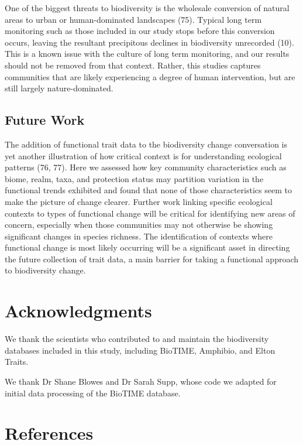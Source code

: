 \documentclass{article}
\begin{document}
One of the biggest threats to biodiversity is the wholesale conversion
of natural areas to urban or human-dominated landscapes (75). Typical
long term monitoring such as those included in our study stops before
this conversion occurs, leaving the resultant precipitous declines in
biodiversity unrecorded (10). This is a known issue with the culture of
long term monitoring, and our results should not be removed from that
context. Rather, this studies captures communities that are likely
experiencing a degree of human intervention, but are still largely
nature-dominated.

\hypertarget{future-work}{%
\subsection{Future Work}\label{future-work}}

The addition of functional trait data to the biodiversity change
conversation is yet another illustration of how critical context is for
understanding ecological patterns (76, 77). Here we assessed how key
community characteristics such as biome, realm, taxa, and protection
status may partition variation in the functional trends exhibited and
found that none of those characteristics seem to make the picture of
change clearer. Further work linking specific ecological contexts to
types of functional change will be critical for identifying new areas of
concern, especially when those communities may not otherwise be showing
significant changes in species richness. The identification of contexts
where functional change is most likely occurring will be a significant
asset in directing the future collection of trait data, a main barrier
for taking a functional approach to biodiversity change.

\hypertarget{acknowledgments}{%
\section{Acknowledgments}\label{acknowledgments}}

We thank the scientists who contributed to and maintain the biodiversity
databases included in this study, including BioTIME, Amphibio, and Elton
Traits.

We thank Dr Shane Blowes and Dr Sarah Supp, whose code we adapted for
initial data processing of the BioTIME database.

\hypertarget{references}{%
\section*{References}\label{references}}
\end{document}
